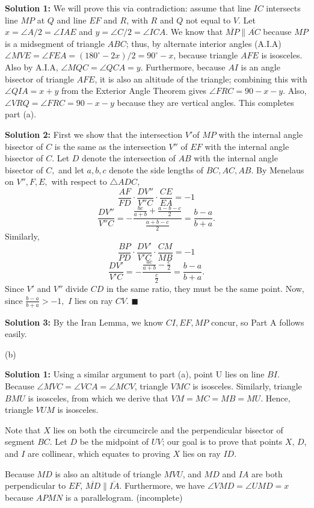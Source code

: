 \begin{enumerate}
 \textbf{Solution 1:} We will prove this via contradiction: assume that line $IC$ intersects line $MP$ at $Q$ and line $EF$ and $R$, with $R$ and $Q$ not equal to $V$. Let $x = \angle A/2 = \angle IAE$ and $y = \angle C/2 = \angle ICA$. We know that $\overline{MP} \parallel \overline{AC}$ because $MP$ is a midsegment of triangle $ABC$; thus, by alternate interior angles (A.I.A) $\angle MVE = \angle FEA = (180^\circ - 2x) / 2 = 90^\circ - x$, because triangle $AFE$ is isosceles. Also by A.I.A, $\angle MQC = \angle QCA = y$. Furthermore, because $AI$ is an angle bisector of triangle $AFE$, it is also an altitude of the triangle; combining this with $\angle QIA = x + y$ from the Exterior Angle Theorem gives $\angle FRC = 90 - x - y$. Also, $\angle VRQ = \angle FRC = 90 - x - y$ because they are vertical angles. This completes part (a).

 \textbf{Solution 2:} First we show that the intersection $V'$of $MP$ with the internal angle bisector of $C$ is the same as the intersection $V''$ of $EF$ with the internal angle bisector of $C.$ Let $D$ denote the intersection of $AB$ with the internal angle bisector of $C,$ and let $a,b,c$ denote the side lengths of $BC, AC, AB.$ By Menelaus on $V'', F, E,$ with respect to $\triangle ADC,$ 
 \[\frac{AF}{FD}\cdot \frac{DV''}{V''C}\cdot \frac{CE}{EA}=-1\]
 \[\frac{DV''}{V''C}=-\frac{\frac{bc}{a+b}+\frac{a-b-c}{2}}{\frac{a+b-c}{2}}=\frac{b-a}{b+a}.\] Similarly, 
 \[\frac{BP}{PD}\cdot \frac{DV'}{V'C}\cdot \frac{CM}{MB}=-1\] 
 \[\frac{DV'}{V'C}=-\frac{\frac{ac}{a+b}-\frac{c}{2}}{\frac{c}{2}}=\frac{b-a}{b+a}.\] Since $V'$ and $V''$ divide $CD$ in the same ratio, they must be the same point. Now, since $\frac{b-a}{b+a}>-1,$ $I$ lies on ray $CV.$ $\blacksquare$

 \textbf{Solution 3:} By the Iran Lemma, we know $CI, EF, MP$ concur, so Part $\text{A}$ follows easily.

 (b)

 \textbf{Solution 1:} Using a similar argument to part (a), point U lies on line $BI$. Because $\angle MVC = \angle VCA = \angle MCV$, triangle $VMC$ is isosceles. Similarly, triangle $BMU$ is isosceles, from which we derive that $VM = MC = MB = MU$. Hence, triangle $VUM$ is isosceles.

 Note that $X$ lies on both the circumcircle and the perpendicular bisector of segment $BC$. Let $D$ be the midpoint of $UV$; our goal is to prove that points $X$, $D$, and $I$ are collinear, which equates to proving $X$ lies on ray $ID$.

 Because $MD$ is also an altitude of triangle $MVU$, and $MD$ and $IA$ are both perpendicular to $EF$, $\overline{MD} \parallel \overline{IA}$. Furthermore, we have $\angle VMD = \angle UMD = x$ because $APMN$ is a parallelogram. (incomplete)


\end{enumerate}
